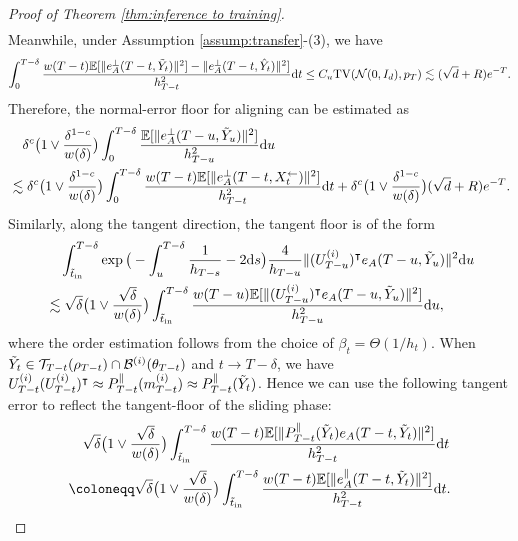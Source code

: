 \documentclass[11pt]{article}
\newcommand{\mb}{\mathbb}
\newcommand{\dee}{\mathrm{d}}
\newcommand{\mc}{\mathcal}
\newcommand{\TV}{\mathrm{TV}}
\begin{document}
\begin{proof}[Proof of Theorem \ref{thm:inference to training}]
\begin{align*}
\end{align*}
Meanwhile, under Assumption \ref{assump:transfer}-(3), we have
\begin{align*}
    \int_0^{T-\delta} \frac{w(T-t)\mb{E}[\| e_A^\perp(T-t,\Tilde{Y}_t)\|^2]-\| e_A^\perp(T-t,\hat{Y}_t)\|^2] }{h_{T-t}^2} \dee t \le C_u \TV(\mc{N}(0,I_d),p_T)\lesssim (\sqrt{d}+R)e^{-T}.
\end{align*}
Therefore, the normal-error floor for aligning can be estimated as
\begin{align*}
   &\quad \delta^c  \big(1 \vee \frac{\delta^{1-c}}{w(\delta)}\big) \int_0^{T-\delta} \frac{\mb{E}[\| e_A^\perp(T-u,\Tilde{Y}_u)\|^2]}{h_{T-u}^2} \dee u  \\
   &\lesssim \delta^c  \big(1 \vee \frac{\delta^{1-c}}{w(\delta)}\big)\int_0^{T-\delta} \frac{w(T-t)\mb{E}[\| e_A^\perp(T-t,X_t^\leftarrow)\|^2]}{h_{T-t}^2}\dee t + \delta^c  \big(1 \vee \frac{\delta^{1-c}}{w(\delta)}\big)(\sqrt{d}+R) e^{-T}.
\end{align*}
Similarly, along the tangent direction, the tangent floor is of the form
\begin{align*}
    &\quad \int_{\Tilde{t}_{\mathrm{in}}}^{T-\delta} \exp\big( -\int_u^{T-\delta} \frac{1}{h_{T-s}}-2 \dee s\big) \frac{4}{h_{T-u}}\|(U_{T-u}^{(i)})^\intercal e_A(T-u,\Tilde{Y}_u) \|^2\dee u\\
    &\lesssim \sqrt{\delta}  \big(1 \vee \frac{\sqrt{\delta}}{w(\delta)}\big) \int_{\Tilde{t}_{\mathrm{in}}}^{T-\delta} \frac{w(T-u)\mb{E}[\| (U_{T-u}^{(i)})^\intercal e_A(T-u,\Tilde{Y}_u)\|^2]}{h_{T-u}^2} \dee u,
\end{align*}
where the order estimation follows from the choice of $\beta_t=\Theta(1/h_t)$. When $\Tilde{Y}_t\in \mc{T}_{T-t}(\rho_{T-t})\cap \mc{B}^{(i)}(\theta_{T-t})$ and $t\to T-\delta$, we have $U_{T-t}^{(i)}(U_{T-t}^{(i)})^\intercal\approx P^\parallel_{T-t}(m_{T-t}^{(i)})\approx P^\parallel_{T-t}(\Tilde{Y}_t) $. Hence we can use the following tangent error to reflect the tangent-floor of the sliding phase:
\begin{align*}
    &\quad \sqrt{\delta}  \big(1 \vee \frac{\sqrt{\delta}}{w(\delta)}\big) \int_{\Tilde{t}_{\mathrm{in}}}^{T-\delta} \frac{w(T-t)\mb{E}[\| P^\parallel_{T-t}(\Tilde{Y}_t) e_A(T-t,\Tilde{Y}_t)\|^2]}{h_{T-t}^2} \dee t \\
    &\coloneqq  \sqrt{\delta}  \big(1 \vee \frac{\sqrt{\delta}}{w(\delta)}\big) \int_{\Tilde{t}_{\mathrm{in}}}^{T-\delta} \frac{w(T-t)\mb{E}[\|  e_A^\parallel(T-t,\Tilde{Y}_t)\|^2]}{h_{T-t}^2} \dee t.
\end{align*}

\end{proof}
\end{document}
